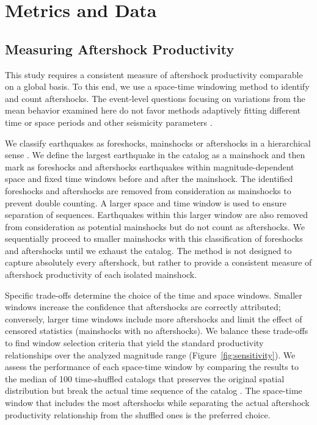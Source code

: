 \documentclass[draft]{agujournal2018}
\begin{document}
\section{Metrics and Data}
   
    \subsection{Measuring Aftershock Productivity}
    
This study requires a consistent measure of aftershock productivity comparable on a global basis. To this end, we use a space-time windowing method to identify and count aftershocks. The event-level questions focusing on variations from the mean behavior examined here do not favor methods adaptively fitting different time or space periods and other seismicity parameters \citep[e.g.][]{ogata2017statistics, Zaliapin2008}.

We classify earthquakes as foreshocks, mainshocks or aftershocks in a hierarchical sense \citep[following][]{felzer2006decay, Brodsky2011TheForeshocks, Wetzler2016}. We define the largest earthquake in the catalog as a mainshock and then mark as foreshocks and aftershocks earthquakes within magnitude-dependent space and fixed time windows before and after the mainshock. The identified foreshocks and aftershocks are removed from consideration as mainshocks to prevent double counting. A larger space and time window is used to ensure separation of sequences. Earthquakes within this larger window are also removed from consideration as potential mainshocks but do not count as aftershocks. We sequentially proceed to smaller mainshocks with this classification of foreshocks and aftershocks until we exhaust the catalog. The method is not designed to capture absolutely every aftershock, but rather to provide a consistent measure of aftershock productivity of each isolated mainshock. 

Specific trade-offs determine the choice of the time and space windows. Smaller windows increase the confidence that aftershocks are correctly attributed; conversely, larger time windows include more aftershocks and limit the effect of censored statistics (mainshocks with no aftershocks). We balance these trade-offs to find window selection criteria that yield the standard productivity relationships over the analyzed magnitude range (Figure~\ref{fig:sensitivity}). We assess the performance of each space-time window by comparing the results to the median of 100 time-shuffled catalogs that preserves the original spatial distribution but break the actual time sequence of the catalog \citep{Garza-Giron2018Mainshock-AftershockRegions}. The space-time window that includes the most aftershocks while separating the actual aftershock productivity relationship from the shuffled ones is the preferred choice.
  
\end{document}
